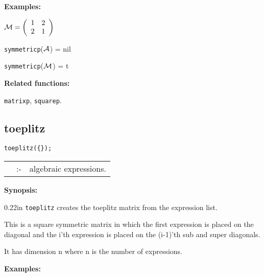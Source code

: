 {\bf Examples:}

\begin{flushleft}
\hspace*{0.175in}
\begin{math}  
{\cal M} = \left( \begin{array}{cc} 1 & 2 \\ 2 & 1 
\end{array} \right)
\end{math}  
\end{flushleft}

\vspace*{0.1in}

\hspace*{0.175in} {\tt symmetricp}(${\cal A}$) = nil 

\hspace*{0.175in} {\tt symmetricp}(${\cal M}$) = t

{\bf Related functions:}

\hspace*{0.175in} {\tt matrixp}, {\tt squarep}.


\subsection{toeplitz}


\hspace*{0.175in} {\tt toeplitz(\{\exprlist{}\});} \lazyfootnote{}

\hspace*{0.1in} 
\begin{tabular}{l l l}
\exprlist{} &:-& algebraic expressions.
\end{tabular}

{\bf Synopsis:} %

\begin{addtolength}{\leftskip}{0.22in}
{\tt toeplitz} creates the toeplitz matrix from the 
                expression list. 

This is a square symmetric matrix in 
                which the first expression is placed on the diagonal 
                and the i'th expression is placed on the (i-1)'th sub 
                and super diagonals.

It has dimension n where n is the 
                number of expressions.

\end{addtolength}

{\bf Examples:}

